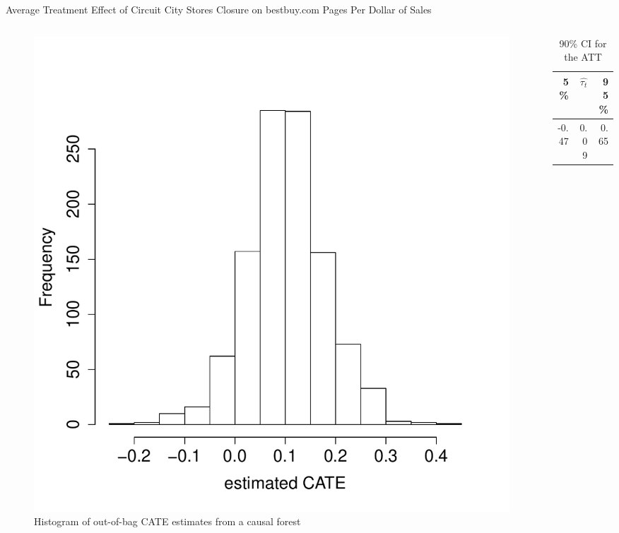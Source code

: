 \documentclass[mathserif, xcolor=table]{beamer}
\begin{document}
\begin{frame}{Average Treatment Effect of Circuit City Stores Closure on bestbuy.com Pages Per Dollar of Sales}
	\vspace{-1em}
	\begin{columns}
		\begin{column}{.6\textwidth}
			\begin{figure}[h]
				\centering
				\includegraphics[scale=0.3]{pic/tauhat3_bb_hist.pdf}
				\caption{ Histogram of out-of-bag CATE estimates from a causal forest}
				\label{fig:tauhat3_bb_hist}
			\end{figure}
		\end{column}
		
		\begin{column}{.39\textwidth}
			\begin{table}[h]
				\caption{90\% CI for the ATT} 
				\centering
				\begin{tabular}{rrr}
					\hline
					5\%  & $\hat{\tau_t}$ & 95\% \\ 
					\hline
					-0.47 & 0.09 & 0.65 \\ 
					\hline
				\end{tabular}
			\end{table}
		\end{column}
	\end{columns}
\end{frame}
\end{document}
